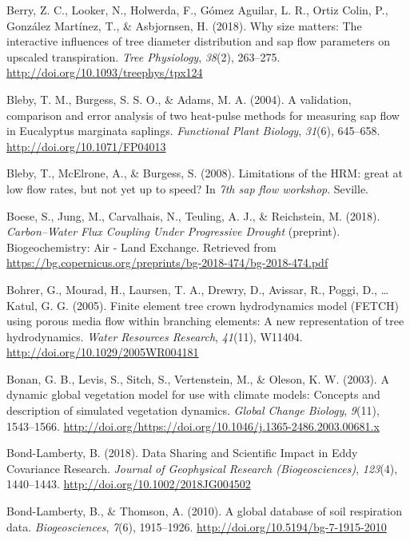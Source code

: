 \documentclass[11pt,twoside]{reedthesis}
\begin{document}
\hypertarget{ref-berry2018}{}
Berry, Z. C., Looker, N., Holwerda, F., Gómez Aguilar, L. R., Ortiz
Colin, P., González Martínez, T., \& Asbjornsen, H. (2018). Why size
matters: The interactive influences of tree diameter distribution and
sap flow parameters on upscaled transpiration. \emph{Tree Physiology},
\emph{38}(2), 263--275. \url{http://doi.org/10.1093/treephys/tpx124}

\hypertarget{ref-Bleby2004}{}
Bleby, T. M., Burgess, S. S. O., \& Adams, M. A. (2004). A validation,
comparison and error analysis of two heat-pulse methods for measuring
sap flow in Eucalyptus marginata saplings. \emph{Functional Plant
Biology}, \emph{31}(6), 645--658. \url{http://doi.org/10.1071/FP04013}

\hypertarget{ref-Bleby2008}{}
Bleby, T., McElrone, A., \& Burgess, S. (2008). Limitations of the HRM:
great at low flow rates, but not yet up to speed? In \emph{7th sap flow
workshop}. Seville.

\hypertarget{ref-boese_carbonwater_2018}{}
Boese, S., Jung, M., Carvalhais, N., Teuling, A. J., \& Reichstein, M.
(2018). \emph{Carbon--Water Flux Coupling Under Progressive Drought}
(preprint). Biogeochemistry: Air - Land Exchange. Retrieved from
\url{https://bg.copernicus.org/preprints/bg-2018-474/bg-2018-474.pdf}

\hypertarget{ref-Bohrer2005}{}
Bohrer, G., Mourad, H., Laursen, T. A., Drewry, D., Avissar, R., Poggi,
D., \ldots{} Katul, G. G. (2005). Finite element tree crown
hydrodynamics model (FETCH) using porous media flow within branching
elements: A new representation of tree hydrodynamics. \emph{Water
Resources Research}, \emph{41}(11), W11404.
\url{http://doi.org/10.1029/2005WR004181}

\hypertarget{ref-Bonan2003}{}
Bonan, G. B., Levis, S., Sitch, S., Vertenstein, M., \& Oleson, K. W.
(2003). A dynamic global vegetation model for use with climate models:
Concepts and description of simulated vegetation dynamics. \emph{Global
Change Biology}, \emph{9}(11), 1543--1566.
\url{http://doi.org/https://doi.org/10.1046/j.1365-2486.2003.00681.x}

\hypertarget{ref-Bond-Lamberty2018}{}
Bond-Lamberty, B. (2018). Data Sharing and Scientific Impact in Eddy
Covariance Research. \emph{Journal of Geophysical Research
(Biogeosciences)}, \emph{123}(4), 1440--1443.
\url{http://doi.org/10.1002/2018JG004502}

\hypertarget{ref-Bond-Lamberty2010}{}
Bond-Lamberty, B., \& Thomson, A. (2010). A global database of soil
respiration data. \emph{Biogeosciences}, \emph{7}(6), 1915--1926.
\url{http://doi.org/10.5194/bg-7-1915-2010}
\end{document}

